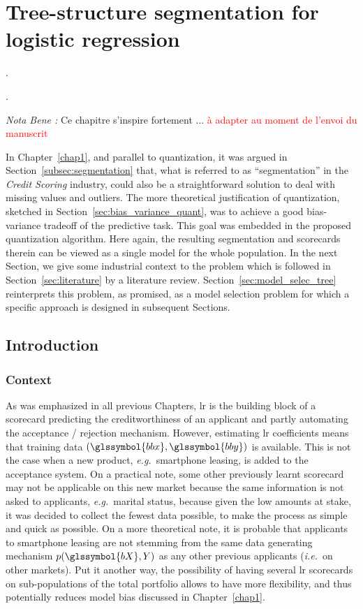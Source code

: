 \chapter{Tree-structure segmentation for logistic regression} \label{chap6}


\epigraph{.}{.}

\minitoc


\textit{Nota Bene :} Ce chapitre s'inspire fortement ... \textcolor{red}{à adapter au moment de l'envoi du manuscrit}

\bigskip

In Chapter~\ref{chap1}, and parallel to quantization, it was argued in Section~\ref{subsec:segmentation} that, what is referred to as ``segmentation'' in the \textit{Credit Scoring} industry, could also be a straightforward solution to deal with missing values and outliers. The more theoretical justification of quantization, sketched in Section~\ref{sec:bias_variance_quant}, was to achieve a good bias-variance tradeoff of the predictive task. This goal was embedded in the proposed quantization algorithm. Here again, the resulting segmentation and scorecards therein can be viewed as a single model for the whole population. In the next Section, we give some industrial context to the problem which is followed in Section~\ref{sec:literature} by a literature review. Section~\ref{sec:model_selec_tree} reinterprets this problem, as promised, as a model selection problem for which a specific approach is designed in subsequent Sections.


\section{Introduction}

\subsection{Context} \label{subsec:context}

As was emphasized in all previous Chapters, \gls{lr} is the building block of a scorecard predicting the creditworthiness of an applicant and partly automating the acceptance / rejection mechanism. However, estimating \gls{lr} coefficients means that training data $(\glssymbol{bbx},\glssymbol{bby})$ is available. This is not the case when a new product, \textit{e.g.}\ smartphone leasing, is added to the acceptance system. On a practical note, some other previously learnt scorecard may not be applicable on this new market because the same information is not asked to applicants, \textit{e.g.}\ marital status, because given the low amounts at stake, it was decided to collect the fewest data possible, to make the process as simple and quick as possible. On a more theoretical note, it is probable that applicants to smartphone leasing are not stemming from the same data generating mechanism $p(\glssymbol{bX},Y)$ as any other previous applicants (\textit{i.e.}\ on other markets). Put it another way, the possibility of having several \gls{lr} scorecards on sub-populations of the total portfolio allows to have more flexibility, and thus potentially reduces model bias discussed in Chapter~\ref{chap1}.

